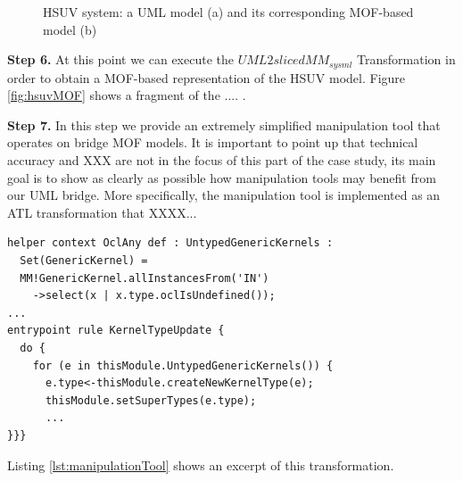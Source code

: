 \begin{figure}
  \caption{HSUV system: a UML model (a) and its corresponding MOF-based model (b)}
  \label{fig:hsuv}
\end{figure}
%
\textbf{Step 6.} At this point we can execute the $UML2slicedMM_{sysml}$ Transformation in order to obtain a MOF-based representation
of the HSUV model. Figure \ref{fig:hsuvMOF} shows a fragment of the .... .

\textbf{Step 7.} In this step we provide an extremely simplified manipulation tool that operates on bridge MOF models. 
It is important to point up that technical accuracy and XXX are not in the focus of this part of the case study, 
its main goal is to show as clearly as possible how manipulation tools may benefit from our UML bridge. 
More specifically, the manipulation tool is implemented as an ATL transformation that XXXX...
%
\begin{lstlisting}[breaklines,style=AMMA,language=ATL,mathescape,rulesepcolor=\color{black},caption=ATL transformation working on MOF-based SysML models,captionpos=b,label={lst:manipulationTool}]
helper context OclAny def : UntypedGenericKernels : 
  Set(GenericKernel) = 
  MM!GenericKernel.allInstancesFrom('IN')
    ->select(x | x.type.oclIsUndefined());
...
entrypoint rule KernelTypeUpdate {
  do {
    for (e in thisModule.UntypedGenericKernels()) {
      e.type<-thisModule.createNewKernelType(e);
      thisModule.setSuperTypes(e.type);
      ...
}}}
\end{lstlisting}

Listing \ref{lst:manipulationTool} shows an excerpt of this transformation. 




